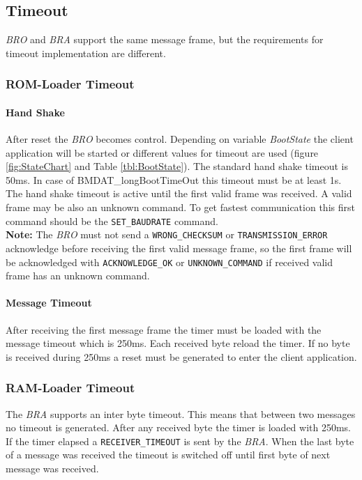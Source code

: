 \documentclass[a4paper,british,oneside,12pt]{scrartcl}
\newcommand{\bra}{\emph{BRA}}
\newcommand{\bro}{\emph{BRO}}
\begin{document}
\newpage
\subsection{Timeout}
\label{sec:Timeout}
\bro{} and \bra{} support the same message frame, but the requirements for timeout implementation are different.
\subsubsection{ROM-Loader Timeout}
\label{sec:ROMLoaderTimeout}
\paragraph{Hand Shake}
\label{sec:HandShake}
After reset the \bro{} becomes control. Depending on variable \emph{BootState} the client application will be started or different values for timeout are used (figure \ref{fig:StateChart} and Table \ref{tbl:BootState}). The standard hand shake timeout is 50ms. In case of BMDAT_longBootTimeOut this timeout must be at least 1s.\\
The hand shake timeout is active until the first valid frame was received. A valid frame may be also an unknown command. To get fastest communication this first command should be the \texttt{SET_BAUDRATE} command.\\ \textbf{Note:} The \bro{} must not send a \texttt{WRONG_CHECKSUM} or \texttt{TRANSMISSION_ERROR} acknowledge before receiving the first valid message frame, so the first frame will be acknowledged with \texttt{ACKNOWLEDGE_OK} or \texttt{UNKNOWN_COMMAND} if received valid frame has an unknown command.

\paragraph{Message Timeout}
\label{sec:MessageTimeout}
After receiving the first message frame the timer must be loaded with the message timeout which is 250ms. Each received byte reload the timer. If no byte is received during 250ms a reset must be generated to enter the client application.
 
\subsubsection{RAM-Loader Timeout}
\label{sec:RAMLoaderTimeout}
The \bra{} supports an inter byte timeout. This means that between two messages no timeout is generated. After any received byte the timer is loaded with 250ms. If the timer elapsed a \texttt{RECEIVER_TIMEOUT} is sent by the \bra{}. When the last byte of a message was received the timeout is switched off until first byte of next message was received.
\end{document}
